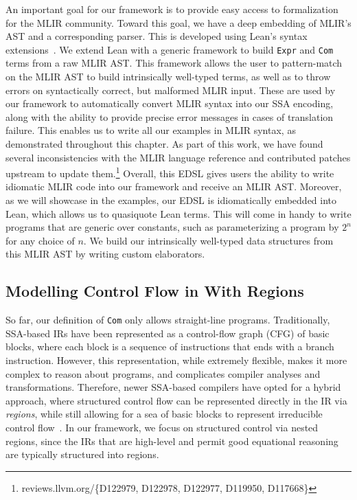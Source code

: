 An important goal for our framework is to provide easy access to formalization for the MLIR community.
Toward this goal, we have a deep embedding of MLIR's AST and a corresponding parser.
This is developed using Lean's syntax extensions~\cite{ullrich2020beyond}.
We extend Lean with a generic framework to build \texttt{Expr} and \texttt{Com} terms from a raw MLIR AST.
This framework allows the user to pattern-match on the MLIR AST to build intrinsically well-typed terms, as well as to throw errors on syntactically correct, but malformed MLIR input.
These are used by our framework to automatically convert MLIR syntax into our SSA encoding, along with the ability to provide precise error messages in cases of translation failure.
This enables us to write all our examples in MLIR syntax, as demonstrated throughout this chapter.
As part of this work, we have found several inconsistencies with the MLIR language reference and contributed patches upstream to update them.\footnote{reviews.llvm.org/\{D122979, D122978, D122977, D119950, D117668\}}
Overall, this EDSL gives users the ability to write idiomatic MLIR code into our framework and receive an MLIR AST.
Moreover, as we will showcase in the examples, our EDSL is idiomatically embedded into Lean, which allows us to quasiquote Lean terms.
This will come in handy to write programs that are generic over constants, such as parameterizing a program by $2^n$ for any choice of $n$.
We build our intrinsically well-typed data structures from this MLIR AST by writing custom elaborators.

\subsection{Modelling Control Flow in \texorpdfstring{}{LeanMLIR(X)} With Regions}
\label{sec:mlir:modelling-control-flow-in-mlirnatural}

So far, our definition of \texttt{Com} only allows straight-line programs.
Traditionally, SSA-based IRs have been represented as a control-flow graph (CFG) of basic blocks,
where each block is a sequence of instructions that ends with a branch instruction.
However, this representation, while extremely flexible, makes it more complex to reason about programs,
and complicates compiler analyses and transformations.
Therefore, newer SSA-based compilers have opted for a hybrid approach,
where structured control flow can be represented directly in the IR via \emph{regions},
while still allowing for a sea of basic blocks to represent irreducible control flow~\cite{aho1985compilers}.
In our framework, we focus on structured control via nested regions,
since the IRs that are high-level and permit good equational reasoning are typically structured into regions.

